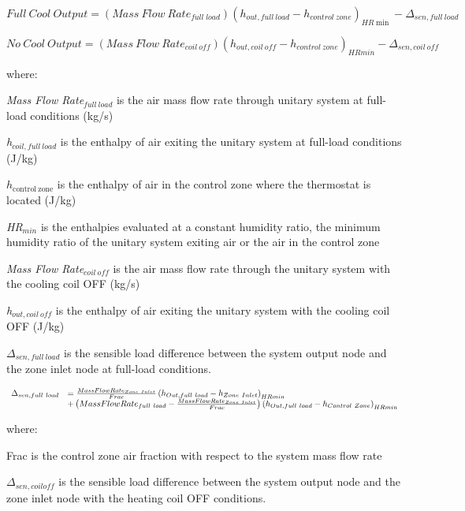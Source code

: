 \begin{equation}
Full~Cool~Output = (Mass~Flow~Rat{e_{full\;load}}){({h_{out,full~load}} - {h_{control~zone}})_{HR\min }} - {\Delta_{sen,full~load}}
\end{equation}

\begin{equation}
No~Cool~Output = (Mass~Flow~Rat{e_{coil~off}}){({h_{out,coil~off}} - {h_{control~zone}})_{HRmin }} - {\Delta_{sen,coil~off}}
\end{equation}

where:

\emph{Mass Flow Rate\(_{full~load}\)} is the air mass flow rate through unitary system at full-load conditions (kg/s)

\emph{h\(_{coil, full~load}\)} is the enthalpy of air exiting the unitary system at full-load conditions (J/kg)

\(h_{\mathrm{control~zone}}\) is the enthalpy of air in the control zone where the thermostat is located (J/kg)

\emph{HR\(_{min}\)} is the enthalpies evaluated at a constant humidity ratio, the minimum humidity ratio of the unitary system exiting air or the air in the control zone

\emph{Mass Flow Rate\(_{coil~off}\)} is the air mass flow rate through the unitary system with the cooling coil OFF (kg/s)

\emph{h\(_{out,coil~off}\)} is the enthalpy of air exiting the unitary system with the cooling coil OFF (J/kg)

\(\Delta_{sen,full~load}\) is the sensible load difference between the system output node and the zone inlet node at full-load conditions.

\begin{equation}
  \begin{array}{rl}
    \Delta_{sen,full~load} &= \frac{MassFlowRate_{Zone~Inlet}}{Frac} \left(h_{Out,full~load} - h_{Zone~Inlet}\right)_{HRmin} \\
                           &+ \left(MassFlowRate_{full~load} - \frac{MassFlowRate_{Zone~Inlet}}{Frac}\right) \left( h_{Out,full~load} - h_{Control~Zone}\right)_{HRmin}
  \end{array}
\end{equation}

where:

Frac is the control zone air fraction with respect to the system mass flow rate

\(\Delta_{sen,coil off}\) is the sensible load difference between the system output node and the zone inlet node with the heating coil OFF conditions.

